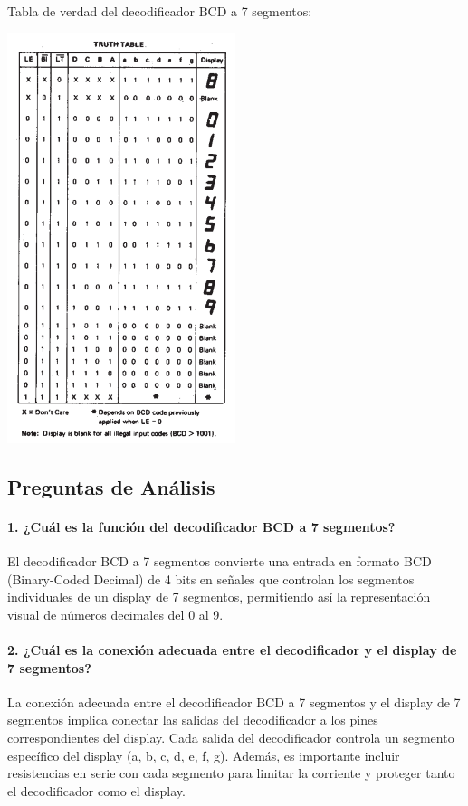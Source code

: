 Tabla de verdad del decodificador BCD a 7 segmentos:

 \includegraphics[width=0.5\textwidth]{./imagenes/tabla.png}


\subsection{Preguntas de Análisis}

\paragraph{1. ¿Cuál es la función del decodificador BCD a 7 segmentos?}

El decodificador BCD a 7 segmentos convierte una entrada en formato BCD (Binary-Coded Decimal) de 4 bits en señales que controlan los segmentos individuales de un display de 7 segmentos, permitiendo así la representación visual de números decimales del 0 al 9.

\paragraph{2. ¿Cuál es la conexión adecuada entre el decodificador y el display de 7 segmentos?}

La conexión adecuada entre el decodificador BCD a 7 segmentos y el display de 7 segmentos implica conectar las salidas del decodificador a los pines correspondientes del display. Cada salida del decodificador controla un segmento específico del display (a, b, c, d, e, f, g). Además, es importante incluir resistencias en serie con cada segmento para limitar la corriente y proteger tanto el decodificador como el display.

